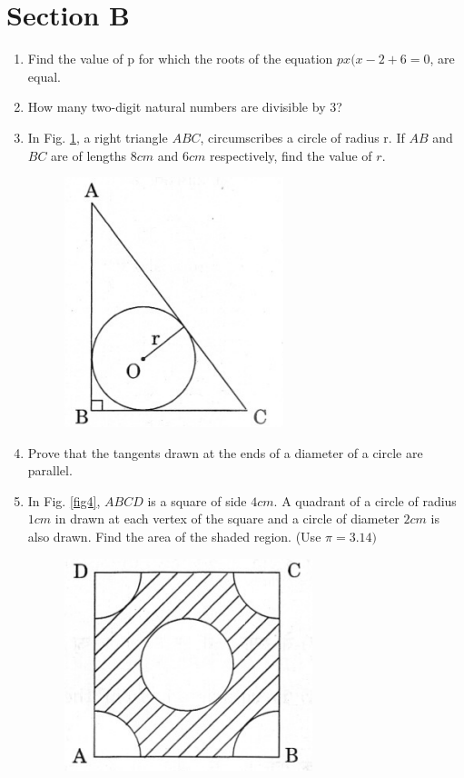 \documentclass[journal,12pt,twocolumn]{IEEEtran}
\renewcommand\thesection{\arabic{section}}
\begin{document}
\section{Section B}
\renewcommand{\theequation}{\theenumi}
\begin{enumerate}[label=\thesection.\arabic*.,ref=\thesection.\theenumi]
\item Find the value of p for which the roots of the equation $px(x-2+6=0$, are equal.\\
\item How many two-digit natural numbers are divisible by 3?\\
\item In Fig. \ref{fig3}, a right triangle $ABC$, circumscribes a circle of radius r. If $AB$ and $BC$ are of lengths $8cm$ and $6cm$ respectively, find the value of $r$. \\
\begin{figure}[h!]
    \centering
    \includegraphics[width=0.5\columnwidth,center]{./fig/3.png}
    \caption{}
    \label{fig3}
 \end{figure}
\item Prove that the tangents drawn at the ends of a diameter of a circle are parallel.\\
\item In Fig. \ref{fig4}, $ABCD$ is a square of side $4 cm$. A quadrant of a circle of radius $1 cm$ in drawn at each vertex of the square and a circle of diameter $2 cm$ is also drawn. Find the area of the shaded region. (Use $\pi = 3.14)$\\
\begin{figure}[h!]
    \centering
    \includegraphics[width=0.5\columnwidth,center]{./fig/4.png}

\end{figure}
\end{enumerate}
\end{document}
